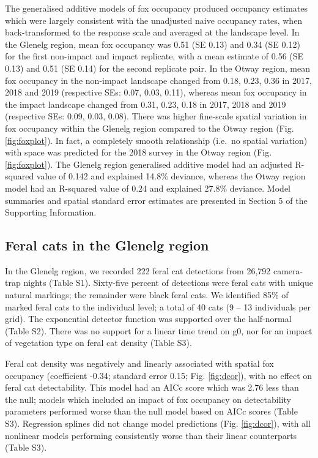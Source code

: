 \documentclass[]{elsarticle} %
\begin{document}
The generalised additive models of fox occupancy produced occupancy estimates which were largely consistent with the unadjusted naive occupancy rates, when back-transformed to the response scale and averaged at the landscape level. In the Glenelg region, mean fox occupancy was 0.51 (SE 0.13) and 0.34 (SE 0.12) for the first non-impact and impact replicate, with a mean estimate of 0.56 (SE 0.13) and 0.51 (SE 0.14) for the second replicate pair. In the Otway region, mean fox occupancy in the non-impact landscape changed from 0.18, 0.23, 0.36 in 2017, 2018 and 2019 (respective SEs: 0.07, 0.03, 0.11), whereas mean fox occupancy in the impact landscape changed from 0.31, 0.23, 0.18 in 2017, 2018 and 2019 (respective SEs: 0.09, 0.03, 0.08). There was higher fine-scale spatial variation in fox occupancy within the Glenelg region compared to the Otway region (Fig. \ref{fig:foxplot}). In fact, a completely smooth relationship (i.e.~no spatial variation) with space was predicted for the 2018 survey in the Otway region (Fig. \ref{fig:foxplot}). The Glenelg region generalised additive model had an adjusted R-squared value of 0.142 and explained 14.8\% deviance, whereas the Otway region model had an R-squared value of 0.24 and explained 27.8\% deviance. Model summaries and spatial standard error estimates are presented in Section 5 of the Supporting Information.

\hypertarget{feral-cats-in-the-glenelg-region}{%
\subsection{Feral cats in the Glenelg region}\label{feral-cats-in-the-glenelg-region}}

In the Glenelg region, we recorded 222 feral cat detections from 26,792 camera-trap nights (Table S1). Sixty-five percent of detections were feral cats with unique natural markings; the remainder were black feral cats. We identified 85\% of marked feral cats to the individual level; a total of 40 cats (9 -- 13 individuals per grid). The exponential detector function was supported over the half-normal (Table S2). There was no support for a linear time trend on g0, nor for an impact of vegetation type on feral cat density (Table S3).

Feral cat density was negatively and linearly associated with spatial fox occupancy (coefficient -0.34; standard error 0.15; Fig. \ref{fig:dcor}), with no effect on feral cat detectability. This model had an AICc score which was 2.76 less than the null; models which included an impact of fox occupancy on detectability parameters performed worse than the null model based on AICc scores (Table S3). Regression splines did not change model predictions (Fig. \ref{fig:dcor}), with all nonlinear models performing consistently worse than their linear counterparts (Table S3).
\end{document}
